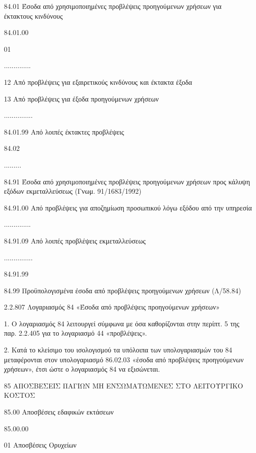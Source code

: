 \documentclass[A4,10pt,greek]{book}
\begin{document}
        84.01    Έσοδα από χρησιμοποιημένες προβλέψεις προηγούμενων χρήσεων
                     για έκτακτους κινδύνους

                     84.01.00

                               01

                     ..............

                               12    Από προβλέψεις για εξαιρετικούς κινδύνους και έκτακτα έξοδα

                               13    Από προβλέψεις για έξοδα προηγούμενων χρήσεων

                     ...............

                     84.01.99    Από λοιπές έκτακτες προβλέψεις

        84.02

        .........

        84.91    Έσοδα από χρησιμοποιημένες προβλέψεις προηγούμενων χρήσεων
                     προς κάλυψη εξόδων εκμεταλλεύσεως (Γνωμ. 91/1683/1992)

                     84.91.00    Από προβλέψεις για αποζημίωση προσωπικού λόγω εξόδου από
                                       την υπηρεσία

                     ..............

                     84.91.09    Από λοιπές προβλέψεις εκμεταλλεύσεως

                     ...............

                     84.91.99

        84.99    Προϋπολογισμένα έσοδα από προβλέψεις προηγούμενων χρήσεων
                    (Λ/58.84)

2.2.807 Λογαριασμός 84 «Έσοδα από προβλέψεις προηγούμενων χρήσεων»

1. Ο λογαριασμός 84 λειτουργεί σύμφωνα με όσα καθορίζονται στην περίπτ. 5 της παρ. 2.2.405 για το λογαριασμό 44 «προβλέψεις».

2. Κατά το κλείσιμο του ισολογισμού τα υπόλοιπα των υπολογαριασμών του 84 μεταφέρονται στον υπολογαριασμό 86.02.03 «έσοδα από προβλέψεις προηγούμενων χρήσεων», έτσι ώστε ο λογαριασμός 84 να εξισώνεται.

85    ΑΠΟΣΒΕΣΕΙΣ ΠΑΓΙΩΝ ΜΗ ΕΝΣΩΜΑΤΩΜΕΝΕΣ
        ΣΤΟ ΛΕΙΤΟΥΡΓΙΚΟ ΚΟΣΤΟΣ

        85.00    Αποσβέσεις εδαφικών εκτάσεων

                    85.00.00

                               01    Αποσβέσεις Ορυχείων
\end{document}
